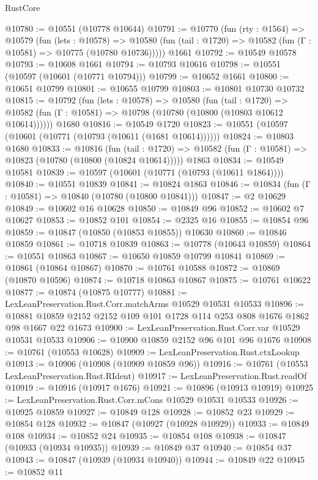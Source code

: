 \begin{lexlean}{RustCore}
\begin{coremodule}
@10780 := @10551 (@10778 @10644)
@10791 := @10770
    (fun (rty : @1564) =>
    @10579
      (fun (lets : @10578) =>
      @10580 (fun (tail : @1720) => @10582 (fun (Γ : @10581) => @10775 (@10780 @10736)))))
    @1661
@10792 := @10549 @10578
@10793 := @10608 @1661
@10794 := @10793 @10616
@10798 := @10551 (@10597 (@10601 (@10771 @10794)))
@10799 := @10652 @1661
@10800 := @10651 @10799
@10801 := @10655 @10799
@10803 := @10801 @10730 @10732
@10815 := @10792
    (fun (lets : @10578) =>
    @10580
      (fun (tail : @1720) =>
      @10582 (fun (Γ : @10581) => @10798 (@10780 (@10800 (@10803 @10612 @10614))))))
    @1680
@10816 := @10549 @1720
@10823 := @10551 (@10597 (@10601 (@10771 (@10793 (@10611 (@1681 @10614))))))
@10824 := @10803 @1680
@10833 := @10816
    (fun (tail : @1720) => @10582 (fun (Γ : @10581) => @10823 (@10780 (@10800 (@10824 @10614)))))
    @1863
@10834 := @10549 @10581
@10839 := @10597 (@10601 (@10771 (@10793 (@10611 @1864))))
@10840 := @10551 @10839
@10841 := @10824 @1863
@10846 := @10834 (fun (Γ : @10581) => @10840 (@10780 (@10800 @10841)))
@10847 := @2 @10629
@10849 := @10602 @16 @10628
@10850 := @10849 @96
@10852 := @10602 @7 @10627
@10853 := @10852 @101
@10854 := @2325 @16
@10855 := @10854 @96
@10859 := @10847 (@10850 (@10853 @10855)) @10630
@10860 := @10846 @10859
@10861 := @10718 @10839
@10863 := @10778 (@10643 @10859)
@10864 := @10551 @10863
@10867 := @10650 @10859 @10799 @10841
@10869 := @10861 (@10864 @10867)
@10870 := @10761 @10588
@10872 := @10869 (@10870 @10596)
@10874 := @10718 @10863 @10867
@10875 := @10761 @10622
@10877 := @10874 (@10875 @10777)
@10881 := LexLeanPreservation.Rust.Corr.matchArms @10529 @10531 @10533
@10896 := @10881 @10859 @2152 @2152 @109 @101 @1728 @114 @253 @808 @1676 @1862 @98 @1667 @22 @1673
@10900 := LexLeanPreservation.Rust.Corr.var @10529 @10531 @10533
@10906 := @10900 @10859 @2152 @96 @101 @96 @1676
@10908 := @10761 (@10553 @10628)
@10909 := LexLeanPreservation.Rust.ctxLookup
@10913 := @10906 (@10908 (@10909 @10859 @96))
@10916 := @10761 (@10553 LexLeanPreservation.Rust.RIdent)
@10917 := LexLeanPreservation.Rust.readOf
@10919 := @10916 (@10917 @1676)
@10921 := @10896 (@10913 @10919)
@10925 := LexLeanPreservation.Rust.Corr.mCons @10529 @10531 @10533
@10926 := @10925 @10859
@10927 := @10849 @128
@10928 := @10852 @23
@10929 := @10854 @128
@10932 := @10847 (@10927 (@10928 @10929))
@10933 := @10849 @108
@10934 := @10852 @24
@10935 := @10854 @108
@10938 := @10847 (@10933 (@10934 @10935))
@10939 := @10849 @37
@10940 := @10854 @37
@10943 := @10847 (@10939 (@10934 @10940))
@10944 := @10849 @22
@10945 := @10852 @11

\end{coremodule}
\end{lexlean}
